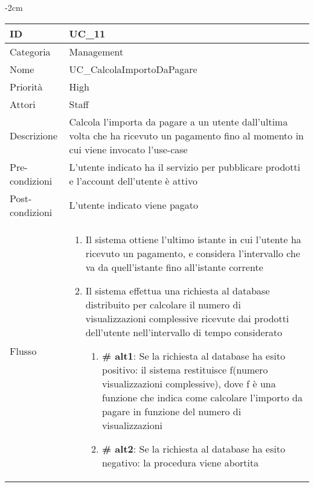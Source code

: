 \begin{center}
\begin{table}[bp]
    \centering
    \addtolength{\leftskip} {-2cm}
\begin{tabular}{ |p{2.6cm}|p{13cm}|  }
\hline
ID & UC\_11 \\\hline
Categoria & Management\\\hline
Nome & UC\_CalcolaImportoDaPagare\\\hline
Priorità & High \\\hline
Attori &  Staff \\\hline
Descrizione & Calcola l'importa da pagare a un utente dall'ultima volta che ha ricevuto un pagamento fino al momento in cui viene invocato l'use-case\\\hline
Pre-condizioni &  L'utente indicato ha il servizio per pubblicare prodotti e l'account dell'utente è attivo\\\hline
Post-condizioni &  L'utente indicato viene pagato\\\hline
Flusso &  	
		\vspace{-5mm} \begin{enumerate}
		\item Il sistema ottiene l'ultimo istante in cui l'utente ha ricevuto un pagamento, e considera l'intervallo che va da quell'istante fino all'istante corrente	
		\item Il sistema effettua una richiesta al database distribuito per calcolare il numero di visualizzazioni complessive ricevute dai prodotti dell'utente nell'intervallo di tempo considerato
		\begin{enumerate}[  ]
			\item \textbf{\# alt1}: Se la richiesta al database ha esito positivo: il sistema restituisce f(numero visualizzazioni complessive), dove f è una funzione che indica come calcolare l'importo da pagare in funzione del numero di visualizzazioni
			\item \textbf{\# alt2}: Se la richiesta al database ha esito negativo: la procedura viene abortita
		\end{enumerate}
		\end{enumerate}\\\hline
\end{tabular}
\label{table_use_case:11}\newline
\end{table}


\end{center}
